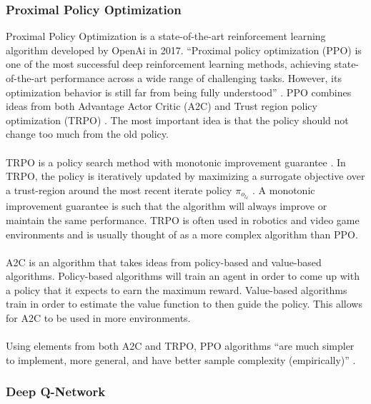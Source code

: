 \documentclass[a4paper,12pt]{article}
\begin{document}
\subsubsection{Proximal Policy Optimization}
Proximal Policy Optimization \cite{SchulmanPPO} is a state-of-the-art reinforcement learning algorithm developed by OpenAi in 2017. ``Proximal policy optimization (PPO) is one of the most successful deep reinforcement learning methods, achieving state-of-the-art performance across a wide range of challenging tasks. However, its optimization behavior is still far from being fully understood'' \cite{Wang}. PPO combines ideas from both Advantage Actor Critic (A2C) and Trust region policy optimization (TRPO)\cite{SchulmanPPO} . The most important idea is that the policy should not change too much from the old policy.
\\\\
TRPO is a policy search method with monotonic improvement guarantee \cite{SchulmanTRPO}. In TRPO, the policy is iteratively updated by maximizing a surrogate objective over a trust-region around the most recent iterate policy $\pi_o_l_d$ \cite{Li}. A monotonic improvement guarantee is such that the algorithm will always improve or maintain the same performance. TRPO is often used in robotics and video game environments and is usually thought of as a more complex algorithm than PPO.
\\\\
A2C is an algorithm that takes ideas from policy-based and value-based algorithms. Policy-based algorithms will train an agent in order to come up with a policy that it expects to earn the maximum reward. Value-based algorithms train in order to estimate the value function to then guide the policy. This allows for A2C to be used in more environments. 
\\\\
Using elements from both A2C and TRPO, PPO algorithms ``are much simpler to implement, more general, and have better sample complexity (empirically)'' \cite{SchulmanPPO}. 

\subsubsection{Deep Q-Network}
\end{document}
